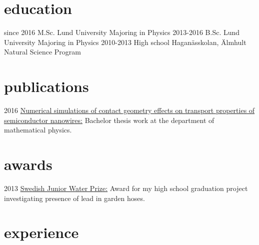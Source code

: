 \documentclass[]{twentysecondcv}
\begin{document}
\section{education}

\begin{twenty}
 \twentyitem
    {since 2016}
    {M.Sc.}
    {Lund University}
    {Majoring in Physics}
  \twentyitem
    {2013-2016}
    {B.Sc.}
    {Lund University}
    {Majoring in Physics}
  \twentyitem
    {2010-2013}
    {High school}
    {Hagan\"asskolan, \"Almhult}
    {Natural Science Program}
\end{twenty}


\section{publications}

\begin{twentyshort}
  \twentyitemshort
  {2016}
  {\href{http://lup.lub.lu.se/student-papers/record/8878322}{Numerical simulations of contact geometry
    effects on transport properties of semiconductor nanowires:}
  Bachelor thesis work at the department of mathematical physics.}
\end{twentyshort}


\section{awards}

\begin{twentyshort}
  \twentyitemshort
    {2013}
    {\href{http://www.siwi.org/latest/vinner-2013-ars-svenska-juniorvattenpris/}{Swedish           
      Junior Water Prize:} Award for my high school graduation project
    investigating presence of lead in garden hoses.}
\end{twentyshort}


\section{experience}
\end{document}
